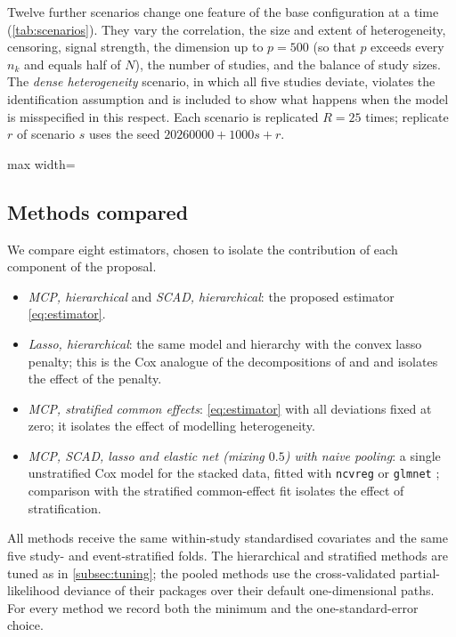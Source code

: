 \documentclass[11pt]{article}
\theoremstyle{remark}
\numberwithin{equation}{section}
\begin{document}
Twelve further scenarios change one feature of the base configuration at a time
(\cref{tab:scenarios}). They vary the correlation, the size and extent of
heterogeneity, censoring, signal strength, the dimension up to $p=500$ (so that
$p$ exceeds every $n_k$ and equals half of $N$), the number of studies, and the
balance of study sizes. The \emph{dense heterogeneity} scenario, in which all
five studies deviate, violates the identification assumption and is included to
show what happens when the model is misspecified in this respect. Each scenario
is replicated $R=25$ times; replicate $r$ of scenario $s$ uses the seed
$20260000+1000s+r$.

\begin{table}[!htbp]
\centering\small
\caption{Simulation scenarios. The base configuration has $K=5$, $n_k=200$,
$p=100$, $\rho=0.5$, $\boldsymbol\alpha_{\mathcal A_0}=(1,-0.8,0.6,-0.5,0.4,-0.3)$,
deviations on covariates 1--4 in two of five studies with
$\sigma_\varepsilon=0.4$, and 30\% censoring.}
\label{tab:scenarios}
\setlength{\tabcolsep}{3pt}
\begin{adjustbox}{max width=\linewidth}\end{adjustbox}
\end{table}

\subsection{Methods compared}
\label{subsec:competitors}

We compare eight estimators, chosen to isolate the contribution of each component
of the proposal.
\begin{itemize}
  \item \emph{MCP, hierarchical} and \emph{SCAD, hierarchical}: the proposed
    estimator \eqref{eq:estimator}.
  \item \emph{Lasso, hierarchical}: the same model and hierarchy with the convex
    lasso penalty; this is the Cox analogue of the decompositions of
    \citet{Cheng2015} and \citet{GrossTibshirani2016} and isolates the effect of
    the penalty.
  \item \emph{MCP, stratified common effects}: \eqref{eq:estimator} with all
    deviations fixed at zero; it isolates the effect of modelling heterogeneity.
  \item \emph{MCP, SCAD, lasso and elastic net (mixing $0.5$) with naive pooling}:
    a single unstratified Cox model for the stacked data, fitted with
    \texttt{ncvreg} \citep{Breheny2011} or \texttt{glmnet} \citep{Friedman2010};
    comparison with the stratified common-effect fit isolates the effect of
    stratification.
\end{itemize}
All methods receive the same within-study standardised covariates and the same
five study- and event-stratified folds. The hierarchical and stratified methods
are tuned as in \cref{subsec:tuning}; the pooled methods use the
cross-validated partial-likelihood deviance of their packages over their default
one-dimensional paths. For every method we record both the minimum and the
one-standard-error choice.
\end{document}
